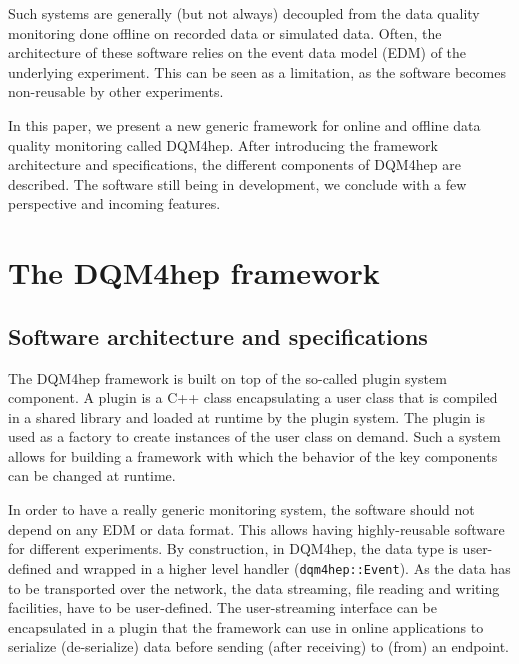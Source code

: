 \documentclass{webofc}
\begin{document}
Such systems are generally (but not always) decoupled from the data quality monitoring done offline on recorded data or simulated data.
Often, the architecture of these software relies on the event data model (EDM) of the underlying experiment. This can be seen as a limitation, as the software becomes non-reusable by other experiments.

In this paper, we present a new generic framework for online and offline data quality monitoring called DQM4hep. 
After introducing the framework architecture and specifications, the different components of DQM4hep are described. 
The software still being in development, we conclude with a few perspective and incoming features.

\section{The DQM4hep framework}
\label{sec:framework}

\subsection{Software architecture and specifications}
\label{subsec:arch}

The DQM4hep framework is built on top of the so-called plugin system component. 
A plugin is a C++ class encapsulating a user class that is compiled in a shared library and loaded at runtime by the plugin system. 
The plugin is used as a factory to create instances of the user class on demand.
Such a system allows for building a framework with which the behavior of the key components can be changed at runtime. 

In order to have a really generic monitoring system, the software should not depend on any EDM or data format. 
This allows having highly-reusable software for different experiments. 
By construction, in DQM4hep, the data type is user-defined and wrapped in a higher level handler (\texttt{dqm4hep::Event}). 
As the data has to be transported over the network, the data streaming, file reading and writing facilities, have to be user-defined.
The user-streaming interface can be encapsulated in a plugin that the framework can use in online applications to serialize (de-serialize) data before sending (after receiving) to (from) an endpoint.
\end{document}
